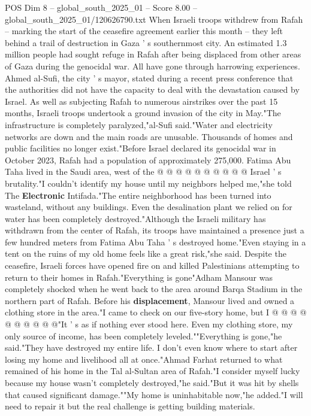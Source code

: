 \begin{textsample}{POS Dim 8 – global\_south\_2025\_01 – Score 8.00 – global\_south\_2025\_01/120626790.txt}  \label{ex:f8_pos_115}
When Israeli troops withdrew from Rafah -- marking the start of the ceasefire agreement earlier this month -- they left behind a trail of destruction in Gaza ' s southernmost city.
An estimated 1.3 million people had sought refuge in Rafah after being displaced from other areas of Gaza during the genocidal war.
All have gone through harrowing experiences.
Ahmed al-Sufi, the city ' s mayor, stated during a recent press conference that the authorities did not have the capacity to deal with the devastation caused by Israel.
As well as subjecting Rafah to numerous airstrikes over the past 15 months, Israeli troops undertook a ground invasion of the city in May."The infrastructure is completely paralyzed,"al-Sufi said."Water and electricity networks are down and the main roads are unusable.
Thousands of homes and public facilities no longer exist."Before Israel declared its genocidal war in October 2023, Rafah had a population of approximately 275,000.
Fatima Abu Taha lived in the Saudi area, west of the @ @ @ @ @ @ @ @ @ @ Israel ' s brutality."I couldn't identify my house until my neighbors helped me,"she told The \textbf{Electronic} Intifada."The entire neighborhood has been turned into wasteland, without any buildings.
Even the desalination plant we relied on for water has been completely destroyed."Although the Israeli military has withdrawn from the center of Rafah, its troops have maintained a presence just a few hundred meters from Fatima Abu Taha ' s destroyed home."Even staying in a tent on the ruins of my old home feels like a great risk,"she said.
Despite the ceasefire, Israeli forces have opened fire on and killed Palestinians attempting to return to their homes in Rafah."Everything is gone"Adham Mansour was completely shocked when he went back to the area around Barqa Stadium in the northern part of Rafah.
Before his \textbf{displacement}, Mansour lived and owned a clothing store in the area."I came to check on our five-story home, but I @ @ @ @ @ @ @ @ @ @"It ' s as if nothing ever stood here.
Even my clothing store, my only source of income, has been completely leveled.""Everything is gone,"he said."They have destroyed my entire life.
I don't even know where to start after losing my home and livelihood all at once."Ahmad Farhat returned to what remained of his home in the Tal al-Sultan area of Rafah."I consider myself lucky because my house wasn't completely destroyed,"he said."But it was hit by shells that caused significant damage.""My home is uninhabitable now,"he added."I will need to repair it but the real challenge is getting building materials.

\end{textsample}
